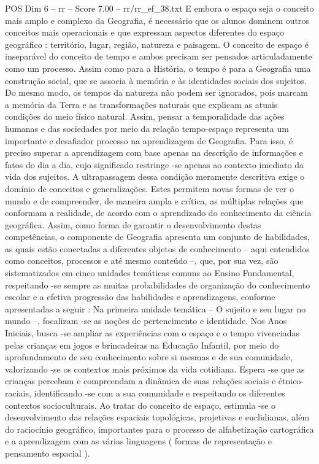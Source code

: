 \begin{textsample}{POS Dim 6 – rr – Score 7.00 – rr/rr\_ef\_38.txt}
E embora o espaço seja o conceito mais amplo e complexo da Geografia, é necessário que os alunos dominem outros conceitos mais operacionais e que expressam aspectos diferentes do espaço geográfico : território, lugar, região, natureza e paisagem.
O conceito de espaço é inseparável do conceito de tempo e ambos precisam ser pensados articuladamente como um processo.
Assim como para a História, o tempo é para a Geografia uma construção social, que se associa à memória e às identidades sociais dos sujeitos.
Do mesmo modo, os tempos da natureza não podem ser ignorados, pois marcam a memória da Terra e as transformações naturais que explicam as atuais condições do meio físico natural.
Assim, pensar a temporalidade das ações humanas e das sociedades por meio da relação tempo-espaço representa um importante e desafiador processo na aprendizagem de Geografia.
Para isso, é preciso superar a aprendizagem com base apenas na descrição de informações e fatos do dia a dia, cujo significado restringe -se apenas ao contexto imediato da vida dos sujeitos.
A ultrapassagem dessa condição meramente descritiva exige o domínio de conceitos e generalizações.
Estes permitem novas formas de ver o mundo e de compreender, de maneira ampla e crítica, as múltiplas relações que conformam a realidade, de acordo com o aprendizado do conhecimento da ciência geográfica.
Assim, como forma de garantir o desenvolvimento destas competências, o componente de Geografia apresenta um conjunto de habilidades, as quais estão conectadas a diferentes objetos de conhecimento – aqui entendidos como conceitos, processos e até mesmo conteúdo –, que, por sua vez, são sistematizados em cinco unidades temáticas comuns ao Ensino Fundamental, respeitando -se sempre as muitas probabilidades de organização do conhecimento escolar e a efetiva progressão das habilidades e aprendizagens, conforme apresentadas a seguir : Na primeira unidade temática – O sujeito e seu lugar no mundo –, focalizam -se as noções de pertencimento e identidade.
Nos Anos Iniciais, busca -se ampliar as experiências com o espaço e o tempo vivenciadas pelas crianças em jogos e brincadeiras na Educação Infantil, por meio do aprofundamento de seu conhecimento sobre si mesmas e de sua comunidade, valorizando -se os contextos mais próximos da vida cotidiana.
Espera -se que as crianças percebam e compreendam a dinâmica de suas relações sociais e étnico-raciais, identificando -se com a sua comunidade e respeitando os diferentes contextos socioculturais.
Ao tratar do conceito de espaço, estimula -se o desenvolvimento das relações espaciais topológicas, projetivas e euclidianas, além do raciocínio geográfico, importantes para o processo de alfabetização cartográfica e a aprendizagem com as várias linguagens ( formas de representação e pensamento espacial ).

\end{textsample}
